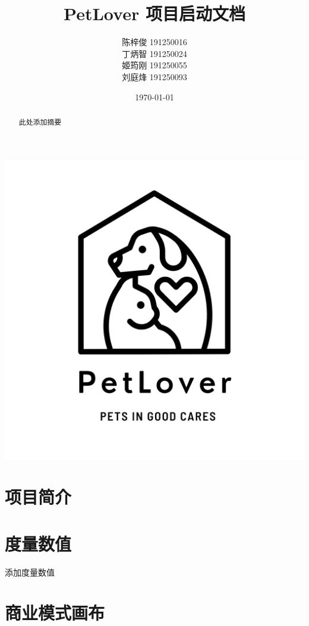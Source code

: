 \documentclass[a4paper]{ctexart}
\title{\Huge PetLover 项目启动文档}
\author{
  陈梓俊 191250016\\
  丁炳智 191250024\\
  姬筠刚 191250055\\
  刘庭烽 191250093\\
}
\date{\today}
\begin{document}
\maketitle

\centerline{\includegraphics[]{logo.png}}

\newpage

\begin{abstract}
  此处添加摘要
\end{abstract}



\tableofcontents

\newpage

\setlength{\parskip}{1em}


\section{项目简介}



\section{度量数值}

添加度量数值

\section{商业模式画布}
\end{document}
